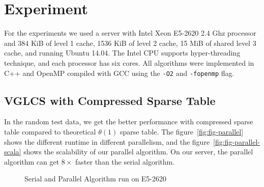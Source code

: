 \section{Experiment}
\label{sec:Experiment}

For the experiments we used a server with Intel Xeon E5-2620 2.4 Ghz
processor and 384 KiB of level 1 cache, 1536 KiB of level 2 cache, 15
MiB of shared level 3 cache, and running Ubuntu 14.04.  The Intel CPU
supports hyper-threading technique, and each processor has six cores.
All algorithms were implemented in C++ and OpenMP compiled with GCC
using the {\tt -O2} and {\tt -fopenmp} flag.

\iffalse
我們運行在 Intel Xeon E5-2620 2.40 GHz 主機上，其擁有 L1 cache 384 KiB、L2 cache 1536 KiB 和 L3 cache 15 MiB，
Intel CPU 同時也支持 hyper-threading 技術，每個處理器有 6 個實體核心。
所有的演算法使用 C++ 和 OpenMP 實作，使用優化參數為 \texttt{-O2} 和 \textt{-fopenmp}。
\fi

\subsection{VGLCS with Compressed Sparse Table}

In the random test data, we get the better performance with compressed
sparse table compared to theoretical $\theta(1)$ sparse table.  The
figure~\ref{fig:fig-parallel} shows the different runtime in different
parallelism, and the figure~\ref{fig:fig-parallel-scala} shows the scalability
of our parallel algorithm.  On our server, the parallel algorithm can
get $8 \times$ faster than the serial algorithm.

\iffalse
我們運行優化策略中的空間壓縮版本，而非理論分析的 $\theta(1)$ 操作，
單次詢問落在 $O(s)$ 中，在實作上由於可以完全壓在暫存器上操作，效能表現較佳。
\fi

\begin{figure}[!thb]
  \centering
  \caption{Serial and Parallel Algorithm run on E5-2620}
\end{figure}


